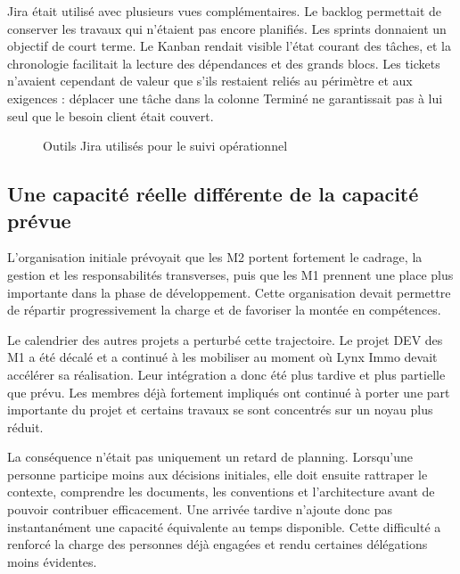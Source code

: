 Jira était utilisé avec plusieurs vues complémentaires. Le backlog permettait de conserver les travaux qui n'étaient pas encore planifiés. Les sprints donnaient un objectif de court terme. Le Kanban rendait visible l'état courant des tâches, et la chronologie facilitait la lecture des dépendances et des grands blocs. Les tickets n'avaient cependant de valeur que s'ils restaient reliés au périmètre et aux exigences : déplacer une tâche dans la colonne \og Terminé \fg ne garantissait pas à lui seul que le besoin client était couvert.

\begin{figure}[H]
\centering
{}
\caption{Outils Jira utilisés pour le suivi opérationnel}
\label{fig:lynx-jira}
\end{figure}

\subsection{Une capacité réelle différente de la capacité prévue}

L'organisation initiale prévoyait que les M2 portent fortement le cadrage, la gestion et les responsabilités transverses, puis que les M1 prennent une place plus importante dans la phase de développement. Cette organisation devait permettre de répartir progressivement la charge et de favoriser la montée en compétences.

Le calendrier des autres projets a perturbé cette trajectoire. Le projet DEV des M1 a été décalé et a continué à les mobiliser au moment où Lynx Immo devait accélérer sa réalisation. Leur intégration a donc été plus tardive et plus partielle que prévu. Les membres déjà fortement impliqués ont continué à porter une part importante du projet et certains travaux se sont concentrés sur un noyau plus réduit.

La conséquence n'était pas uniquement un retard de planning. Lorsqu'une personne participe moins aux décisions initiales, elle doit ensuite rattraper le contexte, comprendre les documents, les conventions et l'architecture avant de pouvoir contribuer efficacement. Une arrivée tardive n'ajoute donc pas instantanément une capacité équivalente au temps disponible. Cette difficulté a renforcé la charge des personnes déjà engagées et rendu certaines délégations moins évidentes.

